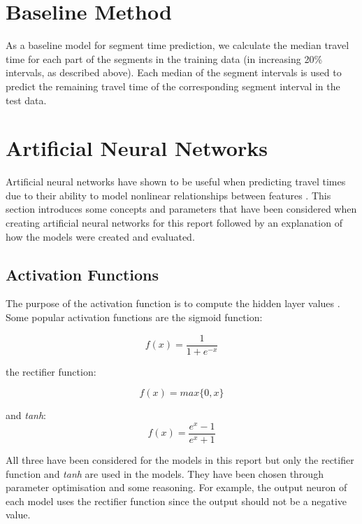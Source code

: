\section{Baseline Method}
As a baseline model for segment time prediction, we calculate the median travel time for each part of the segments in the training data (in increasing 20\% intervals, as described above). Each median of the segment intervals is used to predict the remaining travel time of the corresponding segment interval in the test data.

\section{Artificial Neural Networks}

Artificial neural networks have shown to be useful when predicting travel times due to their ability to model nonlinear relationships between features \cite{brazilANN}\cite{malaysiaANN}. This section introduces some concepts and parameters that have been considered when creating artificial neural networks for this report followed by an explanation of how the models were created and evaluated.

\subsection{Activation Functions}
The purpose of the activation function is to compute the hidden layer values \cite{Goodfellow-et-al-2016}. Some popular activation functions are the sigmoid function:

\begin{equation} 
    f(x) = \frac{1}{1+e^{-x}} 
\end{equation}

the rectifier function:

\begin{equation} 
    f(x) = max\{0,x\}
\end{equation}

and \textit{tanh}:
\begin{equation} 
    f(x) =  \frac{e^x-1}{e^{x}+1} 
\end{equation}

All three have been considered for the models in this report but only the rectifier function and \textit{tanh} are used in the models. They have been chosen through parameter optimisation and some reasoning. For example, the output neuron of each model uses the rectifier function since the output should not be a negative value.


